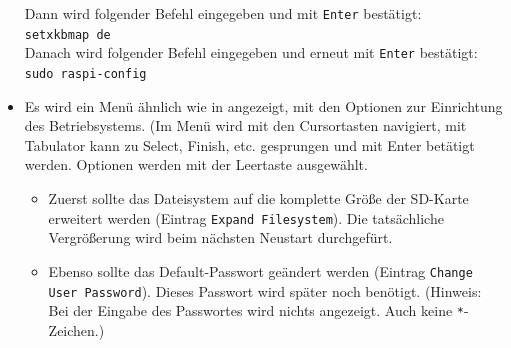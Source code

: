 \begin{itemize}
{		Dann wird folgender Befehl eingegeben und mit \lstinline|Enter| bestätigt:\\
		\lstinline|setxkbmap de|\\
		Danach wird folgender Befehl eingegeben und erneut mit \lstinline|Enter| bestätigt:\\
		\lstinline|sudo raspi-config|
		}
	\item {Es wird ein Menü ähnlich wie in  angezeigt, mit den Optionen zur Einrichtung des Betriebsystems. 
		(Im Menü wird mit den Cursortasten navigiert, mit Tabulator kann zu Select, Finish, etc. gesprungen und mit Enter betätigt werden. Optionen werden mit der Leertaste ausgewählt.
		\begin{itemize}
		\item {Zuerst sollte das Dateisystem auf die komplette Größe der SD-Karte erweitert werden
			(Eintrag \lstinline|Expand Filesystem|). Die tatsächliche Vergrößerung wird beim nächsten Neustart durchgefürt.}
		\item {Ebenso sollte das Default-Passwort geändert werden (Eintrag \lstinline|Change User Password|). Dieses Passwort wird später noch benötigt.
			(Hinweis: Bei der Eingabe des Passwortes wird nichts angezeigt. Auch keine \lstinline|*|-Zeichen.)}

\end{itemize}}
\end{itemize}
